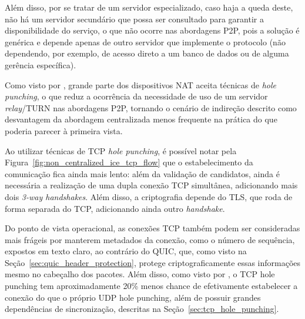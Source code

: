 Além disso, por se tratar de um servidor especializado, caso haja a queda deste, não há um servidor secundário que possa ser consultado para garantir a disponibilidade do serviço, o que não ocorre nas abordagens P2P, pois a solução é genérica e depende apenas de outro servidor que implemente o protocolo (não dependendo, por exemplo, de acesso direto a um banco de dados ou de alguma gerência específica).

Como visto por \citep{ford2005peer}, grande parte dos dispositivos NAT aceita técnicas de \textit{hole punching}, o que reduz a ocorrência da necessidade de uso de um servidor \textit{relay}/TURN nas abordagens P2P, tornando o cenário de indireção descrito como desvantagem da abordagem centralizada menos frequente na prática do que poderia parecer à primeira vista.

Ao utilizar técnicas de TCP \textit{hole punching}, é possível notar pela Figura~\ref{fig:non_centralized_ice_tcp_flow} que o estabelecimento da comunicação fica ainda mais lento: além da validação de candidatos, ainda é necessária a realização de uma dupla conexão TCP simultânea, adicionando mais dois \textit{3-way handshakes}. Além disso, a criptografia depende do TLS, que roda de forma separada do TCP, adicionando ainda outro \textit{handshake}.

Do ponto de vista operacional, as conexões TCP também podem ser consideradas mais frágeis por manterem metadados da conexão, como o número de sequência, expostos em texto claro, ao contrário do QUIC, que, como visto na Seção~\ref{sec:quic_header_protection}, protege criptograficamente essas informações mesmo no cabeçalho dos pacotes. Além disso, como visto por \citep{ford2005peer}, o TCP hole punching tem aproximadamente 20\% menos chance de efetivamente estabelecer a conexão do que o próprio UDP hole punching, além de possuir grandes dependências de sincronização, descritas na Seção~\ref{sec:tcp_hole_punching}.
